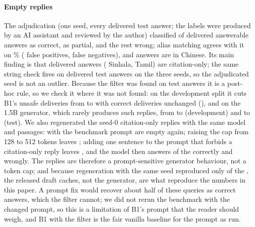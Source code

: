 \paragraph{Empty replies} The adjudication (one seed, every delivered test answer; the labels were produced by an AI assistant and reviewed by the author) classified \LAdjStrictCorrect{} of \LAdjNAns{} delivered answerable answers as correct, \LAdjPartial{} as partial, and the rest wrong; alias matching agrees with it on \LAdjAgreeStrict\% (\LAdjFP{} false positives, \LAdjFN{} false negatives), and \LAdjWrongLang{} answers are in Chinese. Its main finding is that \LAdjEmpty{} delivered answers (\LAdjEmptysi{} Sinhala, \LAdjEmptyta{} Tamil) are citation-only; the same string check fires on \LBemptyFiresPerSeed{} delivered test answers on the three seeds, so the adjudicated seed is not an outlier. Because the filter was found on test answers it is a post-hoc rule, so we check it where it was not found: on the development split it cuts B1's unsafe deliveries from \LBoneDevUnsafe{} to \LBemptyDevUnsafe{} with correct deliveries unchanged (\LBoneDevCorrect), and on the 1.5B generator, which rarely produces such replies, from \NBoneDevUnsafe{} to \NBemptyDevUnsafe{} (development) and \NBoneUnsafe{} to \NBemptyUnsafe{} (test). We also regenerated the \LProbeN{} seed-0 citation-only replies with the same model and passages: with the benchmark prompt \LProbeBaseEmpty{} are empty again; raising the cap from 128 to 512 tokens leaves \LProbeTokensEmpty; adding one sentence to the prompt that forbids a citation-only reply leaves \LProbeInstructEmpty, and the model then answers \LProbeInstructCorrect{} of the \LProbeN{} correctly and \LProbeInstructWrong{} wrongly. The replies are therefore a prompt-sensitive generator behaviour, not a token cap; and because regeneration with the same seed reproduced only \LProbeBaseEmpty{} of the \LProbeN, the released draft caches, not the generator, are what reproduce the numbers in this paper. A prompt fix would recover about half of these queries as correct answers, which the filter cannot; we did not rerun the benchmark with the changed prompt, so this is a limitation of B1's prompt that the reader should weigh, and B1 with the filter is the fair vanilla baseline for the prompt as run.

